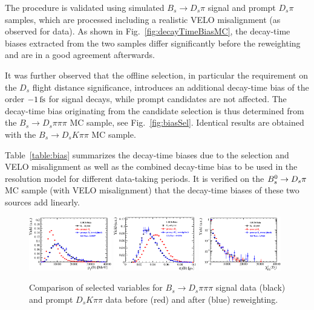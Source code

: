 The procedure is validated using simulated $B_s \to D_s \pi$ signal and prompt $D_s \pi$  samples, 
which are processed including a realistic VELO misalignment (as observed for data).
As shown in Fig.~\ref{fig:decayTimeBiasMC}, the decay-time biases extracted from the two samples differ significantly before the reweighting 
and are in a good agreement afterwards.

It was further observed that the offline selection, in particular the requirement on the $D_s$ flight distance significance, introduces an additional decay-time bias of the order $-1\mathrm{ \,fs}$
for signal decays, while prompt candidates are not affected.
The decay-time bias originating from the candidate selection is thus 
determined from the $B_s \to D_s  \pi\pi\pi$ MC sample, see Fig.~\ref{fig:biasSel}.
Identical results are obtained with the $B_s \to D_s  K\pi\pi$ MC sample.

Table~\ref{table:bias} summarizes the decay-time biases due to the selection and VELO misalignment as well as the combined decay-time bias 
to be used in the resolution model for different data-taking periods.
It is verified on the ${{B}^0_{s}}\rightarrow{\ensuremath{{D}_{s}}}{\ensuremath{\pi}}$ MC sample (with VELO misalignment) that the decay-time biases of these two sources add linearly.

\begin{figure}[h]
\centering
	\includegraphics[width=0.32\textwidth, height = !]{figs/dataVsMC/LTU_noTimeCut/Ds2all_16_Bs_PT.eps} 
	\includegraphics[width=0.32\textwidth, height = !]{figs/dataVsMC/LTU_noTimeCut/Ds2all_16_Bs_DTF_TAUERR.eps} 
	\includegraphics[width=0.32\textwidth, height = !]{figs/dataVsMC/LTU_noTimeCut/Ds2all_16_Ds_FDCHI2_ORIVX.eps} 
\caption{Comparison of selected variables for $B_s \to D_s \pi\pi\pi$ signal data (black) and prompt $D_sK\pi\pi$ data before (red) and after (blue) reweighting.}
\label{fig:rwLTU}
\end{figure}

